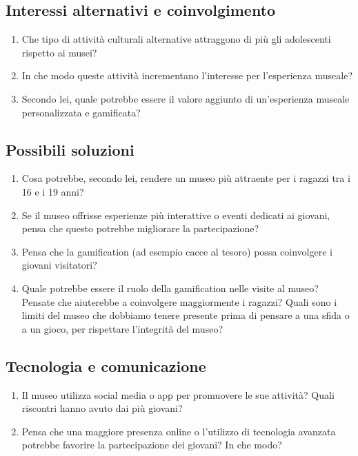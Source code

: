 \documentclass[a4paper, 12pt]{article}
\begin{document}
\subsection{\textcolor{subsectioncolor}{Interessi alternativi e coinvolgimento}}

\begin{enumerate}
    \item Che tipo di attività culturali alternative attraggono di più gli adolescenti rispetto ai musei?
    \item In che modo queste attività incrementano l’interesse per l’esperienza museale?
    \item Secondo lei, quale potrebbe essere il valore aggiunto di un'esperienza museale personalizzata e gamificata?
\end{enumerate}

\subsection{\textcolor{subsectioncolor}{Possibili soluzioni}}

\begin{enumerate}
    \item Cosa potrebbe, secondo lei, rendere un museo più attraente per i ragazzi tra i 16 e i 19 anni?
    \item Se il museo offrisse esperienze più interattive o eventi dedicati ai giovani, pensa che questo potrebbe migliorare la partecipazione?
    \item Pensa che la gamification (ad esempio cacce al tesoro) possa coinvolgere i giovani visitatori?
    \item Quale potrebbe essere il ruolo della gamification nelle visite al museo? Pensate che aiuterebbe a coinvolgere maggiormente i ragazzi? Quali sono i limiti del museo che dobbiamo tenere presente prima di pensare a una sfida o a un gioco, per rispettare l’integrità del museo?
\end{enumerate}

\subsection{\textcolor{subsectioncolor}{Tecnologia e comunicazione}}

\begin{enumerate}
    \item Il museo utilizza social media o app per promuovere le sue attività? Quali riscontri hanno avuto dai più giovani?
    \item Pensa che una maggiore presenza online o l'utilizzo di tecnologia avanzata potrebbe favorire la partecipazione dei giovani? In che modo?
\end{enumerate}
\end{document}
